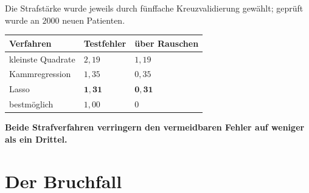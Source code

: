 \begin{merksatz}
Die Strafstärke wurde jeweils durch fünffache Kreuzvalidierung gewählt; geprüft wurde an $2000$ neuen Patienten.

\begin{center}
{\small
\renewcommand{\arraystretch}{1.5}
\begin{tabular}{@{}P{3.2cm}P{2.4cm}P{2.4cm}@{}}
\toprule
\textbf{Verfahren} & \textbf{Testfehler} & \textbf{über Rauschen}\\
\midrule
kleinste Quadrate & $2{,}19$ & $1{,}19$\\
Kammregression & $1{,}35$ & $0{,}35$\\
Lasso & $\mathbf{1{,}31}$ & $\mathbf{0{,}31}$\\
\midrule
bestmöglich & $1{,}00$ & $0$\\
\bottomrule
\end{tabular}}
\end{center}

\begin{center}
\begin{minipage}{0.9\textwidth}
\textbf{Beide Strafverfahren verringern den vermeidbaren Fehler auf weniger als ein Drittel.}
\end{minipage}
\end{center}

\begin{center}
\begin{minipage}{0.88\textwidth}
\end{minipage}
\end{center}
\end{merksatz}

\section{Der Bruchfall}

